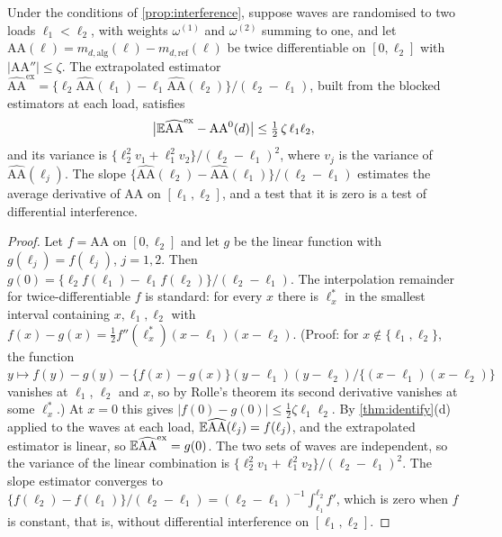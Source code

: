 \begin{proposition}\label{prop:int-saturation}
Under the conditions of \cref{prop:interference}, suppose waves are randomised to two loads $\ell_1<\ell_2$, with weights $\omega^{(1)}$ and $\omega^{(2)}$ summing to one, and let $\mathrm{AA}(\ell)=m_{d,\mathrm{alg}}(\ell)-m_{d,\mathrm{ref}}(\ell)$ be twice differentiable on $[0,\ell_2]$ with $|\mathrm{AA}''|\le\zeta$. The extrapolated estimator $\widehat{\mathrm{AA}}^{\mathrm{ex}}=\{\ell_2\widehat{\mathrm{AA}}(\ell_1)-\ell_1\widehat{\mathrm{AA}}(\ell_2)\}/(\ell_2-\ell_1)$, built from the blocked estimators at each load, satisfies
\[
  \bigl|\mathbb{E}\widehat{\mathrm{AA}}^{\mathrm{ex}}-\mathrm{AA}^0(d)\bigr|\le\tfrac12\,\zeta\,\ell_1\ell_2,
\]
and its variance is $\{\ell_2^2v_1+\ell_1^2v_2\}/(\ell_2-\ell_1)^2$, where $v_j$ is the variance of $\widehat{\mathrm{AA}}(\ell_j)$. The slope $\{\widehat{\mathrm{AA}}(\ell_2)-\widehat{\mathrm{AA}}(\ell_1)\}/(\ell_2-\ell_1)$ estimates the average derivative of $\mathrm{AA}$ on $[\ell_1,\ell_2]$, and a test that it is zero is a test of differential interference.
\end{proposition}

\begin{proof}
Let $f=\mathrm{AA}$ on $[0,\ell_2]$ and let $g$ be the linear function with $g(\ell_j)=f(\ell_j)$, $j=1,2$. Then $g(0)=\{\ell_2f(\ell_1)-\ell_1f(\ell_2)\}/(\ell_2-\ell_1)$. The interpolation remainder for twice-differentiable $f$ is standard: for every $x$ there is $\ell^\ast_x$ in the smallest interval containing $x,\ell_1,\ell_2$ with $f(x)-g(x)=\frac12f''(\ell^\ast_x)(x-\ell_1)(x-\ell_2)$. (Proof: for $x\notin\{\ell_1,\ell_2\}$, the function $y\mapsto f(y)-g(y)-\{f(x)-g(x)\}(y-\ell_1)(y-\ell_2)/\{(x-\ell_1)(x-\ell_2)\}$ vanishes at $\ell_1$, $\ell_2$ and $x$, so by Rolle's theorem its second derivative vanishes at some $\ell^\ast_x$.) At $x=0$ this gives $|f(0)-g(0)|\le\frac12\zeta\ell_1\ell_2$. By \cref{thm:identify}(d) applied to the waves at each load, $\mathbb{E}\widehat{\mathrm{AA}}(\ell_j)=f(\ell_j)$, and the extrapolated estimator is linear, so $\mathbb{E}\widehat{\mathrm{AA}}^{\mathrm{ex}}=g(0)$. The two sets of waves are independent, so the variance of the linear combination is $\{\ell_2^2v_1+\ell_1^2v_2\}/(\ell_2-\ell_1)^2$. The slope estimator converges to $\{f(\ell_2)-f(\ell_1)\}/(\ell_2-\ell_1)=(\ell_2-\ell_1)^{-1}\int_{\ell_1}^{\ell_2}f'$, which is zero when $f$ is constant, that is, without differential interference on $[\ell_1,\ell_2]$.
\end{proof}

